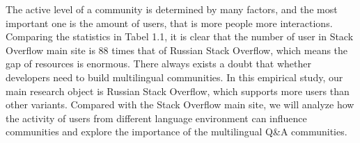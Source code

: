 \par
	The active level of a community is determined by many factors, and the most important one is the amount of users, that is more people more interactions. Comparing the statistics in Tabel 1.1, it is clear that the number of user in Stack Overflow main site is 88 times that of Russian Stack Overflow, which means the gap of resources is enormous. There always exists a doubt that whether developers need to build multilingual communities. In this empirical study, our main research object is Russian Stack Overflow, which supports more users than other variants. Compared with the Stack Overflow main site, we will analyze how the activity of users from different language environment can influence communities and explore the importance of the multilingual Q\&A communities.\par
	
